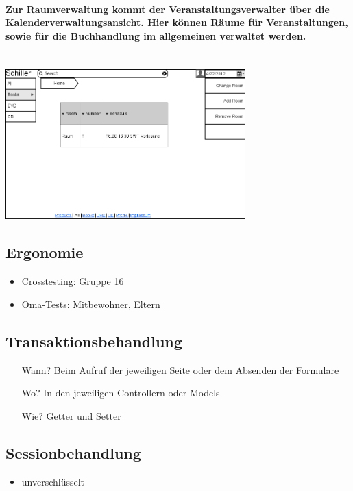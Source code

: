 \documentclass[a4paper]{article}
\begin{document}
\paragraph{Zur Raumverwaltung kommt der Veranstaltungsverwalter über die Kalenderverwaltungsansicht. Hier können Räume für Veranstaltungen, sowie für die Buchhandlung im allgemeinen verwaltet werden.\\ \\}
\includegraphics[width=350px]{19ChangeRoom.png}

\subsection{Ergonomie}

\begin{itemize}
	\item Crosstesting: Gruppe 16
	\item Oma-Tests: Mitbewohner, Eltern
\end{itemize}

\subsection{Transaktionsbehandlung}

\begin{itemize}
	\item[Wann?] Beim Aufruf der jeweiligen Seite oder dem Absenden der Formulare
	\item[Wo?] In den jeweiligen Controllern oder Models
	\item[Wie?] Getter und Setter
\end{itemize}

\subsection{Sessionbehandlung}

\begin{itemize}
	\item unverschlüsselt
\end{itemize}
\end{document}
